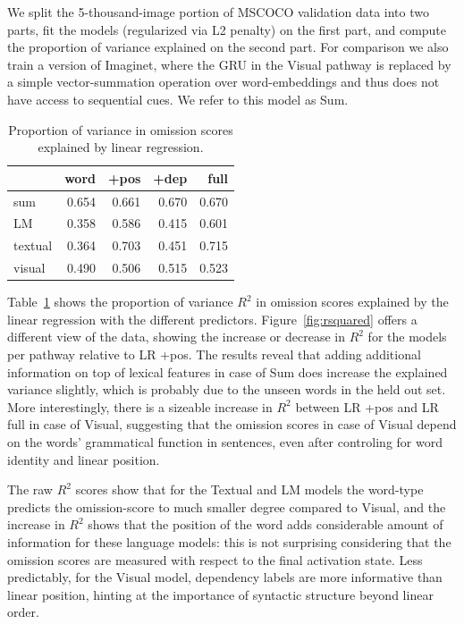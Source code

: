 \noindent We split the 5-thousand-image portion of MSCOCO validation data into two parts, fit the 
models (regularized via L2 penalty) on the first part, and compute the 
proportion of variance explained on the second part. 
For comparison we also train a version of {\sc Imaginet},
where the GRU in the {\sc Visual} pathway is replaced by a simple vector-summation operation
over word-embeddings and thus does not have access to sequential cues. We refer to this
model as {\sc Sum}. 

\begin{table}
  \centering
  \caption{Proportion of variance in omission scores explained by
    linear regression.}
    \begin{tabular}{l|rrrr}
               & word   & +pos  & +dep  & full \\\hline
     sum       & 0.654  & 0.661 & 0.670 & 0.670 \\
     LM        & 0.358  & 0.586 & 0.415 & 0.601 \\
     textual   & 0.364  & 0.703 & 0.451 & 0.715 \\
     visual    & 0.490  & 0.506 & 0.515 & 0.523 \\
    \end{tabular}
    \label{tab:lr-r2}
\end{table}

Table~\ref{tab:lr-r2} shows the proportion of variance $R^2$ in omission
scores explained by the linear regression with the different predictors.
Figure~\ref{fig:rsquared} offers a different view of the data, showing
the increase or decrease in $R^2$ for the models per pathway relative to {\sc LR
  +pos}.  The results reveal that adding additional information on
top of lexical features in case of {\sc Sum} does increase the
explained variance slightly, which is probably due to the unseen words
in the held out set. More interestingly, there is a sizeable
increase in $R^2$ between {\sc LR +pos} and {\sc LR full} in
case of {\sc Visual}, suggesting that 
the omission scores in case of {\sc Visual} depend on the words'
grammatical function in sentences, even after controling for word
identity and linear position.  

The raw $R^2$ scores show that for the {\sc Textual} and {\sc LM}
models the word-type predicts the omission-score to much smaller
degree compared to {\sc Visual}, and the increase in $R^2$ shows that
the position of the word adds considerable amount of information for
these language models: this is not surprising considering that the omission
scores are measured with respect to the final activation state. 
Less predictably, for the {\sc Visual} model,
dependency labels are more informative than linear position,
hinting at the importance of syntactic structure beyond linear order.

